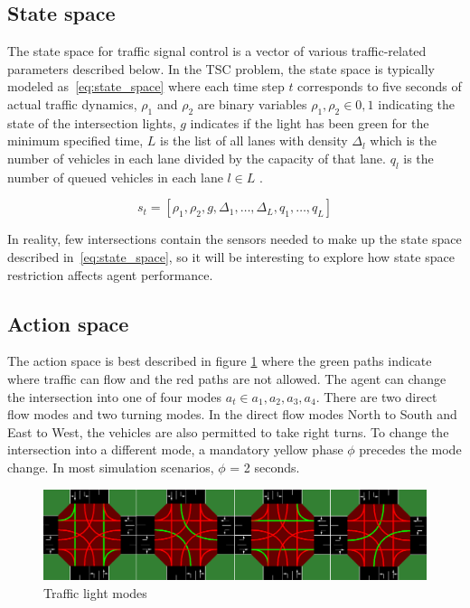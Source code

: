 \documentclass[letterpaper]{article} %
\begin{document}
\subsection{State space}
The state space for traffic signal control is a vector of various traffic-related parameters described below.
In the TSC problem, the state space is typically modeled as~\ref{eq:state_space} where each time step \(t\) corresponds to five seconds of actual traffic dynamics, \(\rho_1\) and \(\rho_2\) are binary variables \(\rho_1, \rho_2 \in {0, 1}\) indicating the state of the intersection lights, \(g\) indicates if the light has been green for the minimum specified time, \(L\) is the list of all lanes with density \(\Delta_l\) which is the number of vehicles in each lane divided by the capacity of that lane.
\(q_l\) is the number of queued vehicles in each lane \(l \in L\) \cite{Almeida2022MultiagentRL}.

\begin{equation}
s_t = [\rho_1, \rho_2, g, \Delta_1, \ldots, \Delta_L, q_1, \ldots, q_L]
\label{eq:state_space}
\end{equation}

In reality, few intersections contain the sensors needed to make up the state space described in~\ref{eq:state_space}, so it will be interesting to explore how state space restriction affects agent performance.

\subsection{Action space}
The action space is best described in figure \ref{fig:action_space} where the green paths indicate where traffic can flow and the red paths are not allowed.
The agent can change the intersection into one of four modes \(a_t \in {a_1, a_2, a_3, a_4}\).
There are two direct flow modes and two turning modes.
In the direct flow modes North to South and East to West, the vehicles are also permitted to take right turns.
To change the intersection into a different mode, a mandatory yellow phase $\phi$ precedes the mode change.
In most simulation scenarios, $\phi$ = 2 seconds.

\begin{figure}[htbp]
  \centering
  \includegraphics[width=0.8\linewidth]{actions.png}
  \caption{Traffic light modes}
  \label{fig:action_space}
\end{figure}
\end{document}
